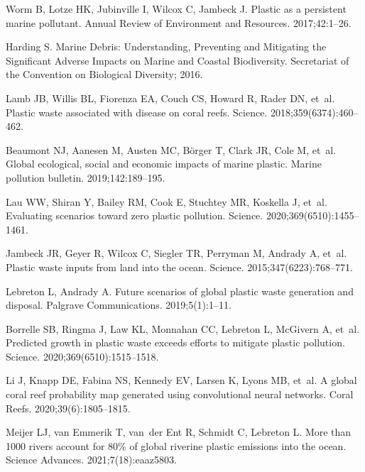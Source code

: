 \documentclass[10pt,letterpaper]{article}
\begin{document}
\begin{thebibliography}{10}
Worm B, Lotze HK, Jubinville I, Wilcox C, Jambeck J.
\newblock Plastic as a persistent marine pollutant.
\newblock Annual Review of Environment and Resources. 2017;42:1--26.

Harding S.
\newblock Marine Debris: Understanding, Preventing and Mitigating the
  Significant Adverse Impacts on Marine and Coastal Biodiversity.
\newblock Secretariat of the Convention on Biological Diversity; 2016.

Lamb JB, Willis BL, Fiorenza EA, Couch CS, Howard R, Rader DN, et~al.
\newblock Plastic waste associated with disease on coral reefs.
\newblock Science. 2018;359(6374):460--462.

Beaumont NJ, Aanesen M, Austen MC, B{\"o}rger T, Clark JR, Cole M, et~al.
\newblock Global ecological, social and economic impacts of marine plastic.
\newblock Marine pollution bulletin. 2019;142:189--195.

Lau WW, Shiran Y, Bailey RM, Cook E, Stuchtey MR, Koskella J, et~al.
\newblock Evaluating scenarios toward zero plastic pollution.
\newblock Science. 2020;369(6510):1455--1461.

Jambeck JR, Geyer R, Wilcox C, Siegler TR, Perryman M, Andrady A, et~al.
\newblock Plastic waste inputs from land into the ocean.
\newblock Science. 2015;347(6223):768--771.

Lebreton L, Andrady A.
\newblock Future scenarios of global plastic waste generation and disposal.
\newblock Palgrave Communications. 2019;5(1):1--11.

Borrelle SB, Ringma J, Law KL, Monnahan CC, Lebreton L, McGivern A, et~al.
\newblock Predicted growth in plastic waste exceeds efforts to mitigate plastic
  pollution.
\newblock Science. 2020;369(6510):1515--1518.

Li J, Knapp DE, Fabina NS, Kennedy EV, Larsen K, Lyons MB, et~al.
\newblock A global coral reef probability map generated using convolutional
  neural networks.
\newblock Coral Reefs. 2020;39(6):1805--1815.

Meijer LJ, van Emmerik T, van~der Ent R, Schmidt C, Lebreton L.
\newblock More than 1000 rivers account for 80\% of global riverine plastic
  emissions into the ocean.
\newblock Science Advances. 2021;7(18):eaaz5803.


\end{thebibliography}
\end{document}
